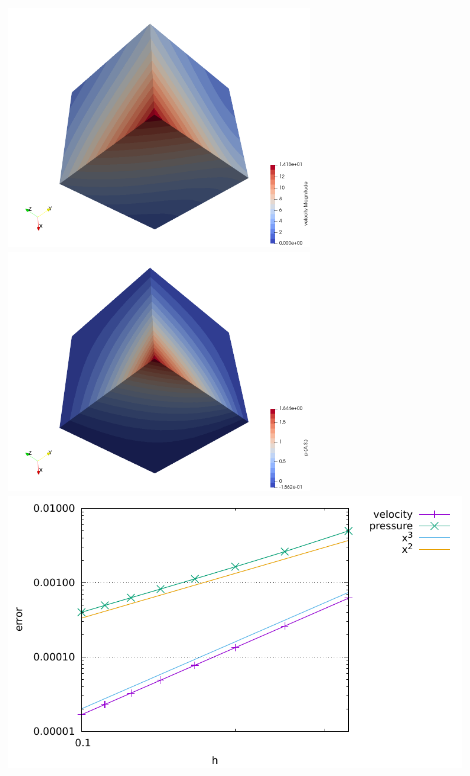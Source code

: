 \begin{center}
\includegraphics[width=8cm]{python_codes/fieldstone_burstedde/results_isoviscous/velocity}
\includegraphics[width=8cm]{python_codes/fieldstone_burstedde/results_isoviscous/pressure}\\
\includegraphics[width=12cm]{python_codes/fieldstone_burstedde/results_isoviscous/errors.pdf}
\end{center}


